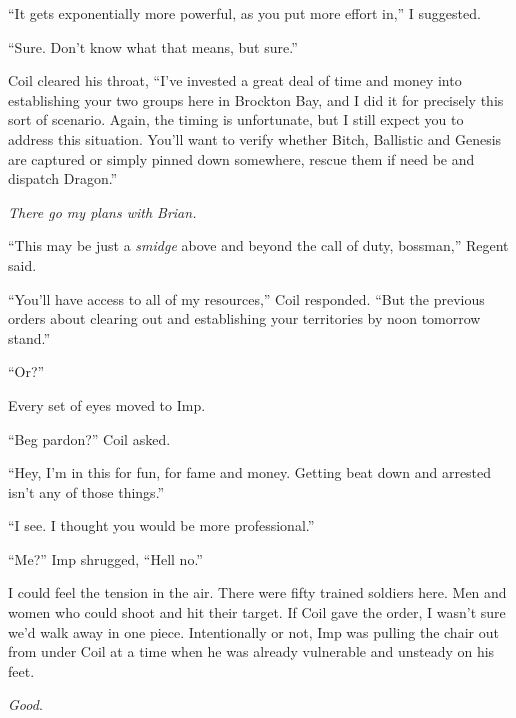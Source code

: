 ``It gets exponentially more powerful, as you put more effort in,'' I suggested.



``Sure.  Don't know what that means, but sure.''



Coil cleared his throat, ``I've invested a great deal of time and money into establishing your two groups here in Brockton Bay, and I did it for precisely this sort of scenario.  Again, the timing is unfortunate, but I still expect you to address this situation.  You'll want to verify whether Bitch, Ballistic and Genesis are captured or simply pinned down somewhere, rescue them if need be and dispatch Dragon.''



\emph{There go my plans with Brian.}



``This may be just a \emph{smidge} above and beyond the call of duty, bossman,'' Regent said.



``You'll have access to all of my resources,'' Coil responded.  ``But the previous orders about clearing out and establishing your territories by noon tomorrow stand.''



``Or?''



Every set of eyes moved to Imp.



``Beg pardon?'' Coil asked.



``Hey, I'm in this for fun, for fame and money.  Getting beat down and arrested isn't any of those things.''



``I see.  I thought you would be more professional.''



``Me?''  Imp shrugged, ``Hell no.''



I could feel the tension in the air.  There were fifty trained soldiers here.  Men and women who could shoot and hit their target.  If Coil gave the order, I wasn't sure we'd walk away in one piece.  Intentionally or not, Imp was pulling the chair out from under Coil at a time when he was already vulnerable and unsteady on his feet.



\emph{Good}.



